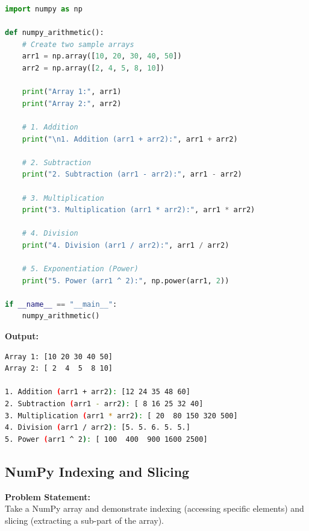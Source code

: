 \documentclass[a4paper,12pt]{article}
\begin{document}
\begin{lstlisting}[language=Python, caption={NumPy Arithmetic Operations}]
import numpy as np

def numpy_arithmetic():
    # Create two sample arrays
    arr1 = np.array([10, 20, 30, 40, 50])
    arr2 = np.array([2, 4, 5, 8, 10])

    print("Array 1:", arr1)
    print("Array 2:", arr2)

    # 1. Addition
    print("\n1. Addition (arr1 + arr2):", arr1 + arr2)

    # 2. Subtraction
    print("2. Subtraction (arr1 - arr2):", arr1 - arr2)

    # 3. Multiplication
    print("3. Multiplication (arr1 * arr2):", arr1 * arr2)

    # 4. Division
    print("4. Division (arr1 / arr2):", arr1 / arr2)

    # 5. Exponentiation (Power)
    print("5. Power (arr1 ^ 2):", np.power(arr1, 2))

if __name__ == "__main__":
    numpy_arithmetic()
\end{lstlisting}
\vspace{0.5cm}
\textbf{Output:}
\begin{lstlisting}[language=bash]
Array 1: [10 20 30 40 50]
Array 2: [ 2  4  5  8 10]

1. Addition (arr1 + arr2): [12 24 35 48 60]
2. Subtraction (arr1 - arr2): [ 8 16 25 32 40]
3. Multiplication (arr1 * arr2): [ 20  80 150 320 500]
4. Division (arr1 / arr2): [5. 5. 6. 5. 5.]
5. Power (arr1 ^ 2): [ 100  400  900 1600 2500]
\end{lstlisting}


\subsection{NumPy Indexing and Slicing}
\textbf{Problem Statement:} \\
Take a NumPy array and demonstrate indexing (accessing specific elements) and slicing (extracting a sub-part of the array).
\end{document}
